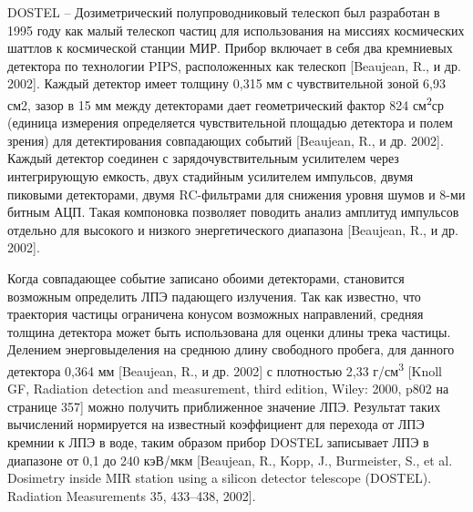 DOSTEL -- Дозиметрический полупроводниковый телескоп был разработан в 1995 году как малый телескоп частиц для использования на миссиях космических шаттлов к космической станции МИР. Прибор включает в себя два кремниевых детектора по технологии PIPS, расположенных как телескоп [Beaujean, R., и др. 2002]. Каждый детектор имеет толщину 0,315 мм с чувствительной зоной 6,93 см2, зазор в 15 мм между детекторами дает геометрический фактор 824 см\textsuperscript{2}ср (единица измерения определяется чувствительной площадью детектора и полем зрения) для детектирования совпадающих событий [Beaujean, R., и др. 2002]. Каждый детектор соединен с зарядочувствительным усилителем через интегрирующую емкость, двух стадийным усилителем импульсов, двумя пиковыми детекторами, двумя RC-фильтрами для снижения уровня шумов и 8-ми битным АЦП. Такая компоновка позволяет поводить анализ амплитуд импульсов отдельно для высокого и низкого энергетического диапазона [Beaujean, R., и др. 2002].


Когда совпадающее событие записано обоими детекторами, становится возможным определить ЛПЭ падающего излучения. Так как известно, что траектория частицы ограничена конусом возможных направлений, средняя толщина детектора может быть использована для оценки длины трека частицы. Делением энерговыделения на среднюю длину свободного пробега, для данного детектора 0,364 мм [Beaujean, R., и др. 2002] с плотностью 2,33 г/см\textsuperscript{3} [Knoll GF, Radiation detection and measurement, third edition, Wiley: 2000, p802  на странице 357]  можно получить приближенное значение ЛПЭ. Результат таких вычислений нормируется на известный коэффициент для перехода от ЛПЭ кремнии к ЛПЭ в воде, таким образом прибор DOSTEL записывает ЛПЭ в диапазоне от 0,1 до 240 кэВ/мкм [Beaujean, R., Kopp, J., Burmeister, S., et al. Dosimetry inside MIR station using a silicon detector telescope (DOSTEL). Radiation Measurements 35, 433--438, 2002].


